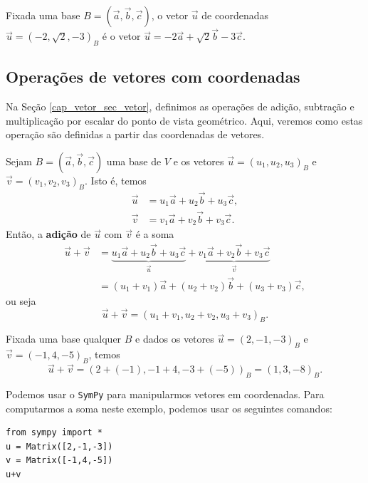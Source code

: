 \begin{ex}
  Fixada uma base $B = (\vec{a}, \vec{b}, \vec{c})$, o vetor $\vec{u}$ de coordenadas $\vec{u}=(-2,\sqrt{2},-3)_B$ é o vetor $\vec{u} = -2\vec{a} + \sqrt{2}\vec{b} - 3\vec{c}$.
\end{ex}

\subsection{Operações de vetores com coordenadas}


Na Seção \ref{cap_vetor_sec_vetor}, definimos as operações de adição, subtração e multiplicação por escalar do ponto de vista geométrico. Aqui, veremos como estas operação são definidas a partir das coordenadas de vetores.

Sejam $B = (\vec{a}, \vec{b}, \vec{c})$ uma base de $V$ e os vetores $\vec{u} = (u_1, u_2, u_3)_B$ e $\vec{v} = (v_1, v_2, v_3)_B$. Isto é, temos
\begin{align}
  \vec{u} &= u_1\vec{a} + u_2\vec{b} + u_3\vec{c},\\
  \vec{v} &= v_1\vec{a} + v_2\vec{b} + v_3\vec{c}.
\end{align}
Então, a {\bf adição} de $\vec{u}$ com $\vec{v}$ é a soma
\begin{align}
  \vec{u}+\vec{v} &= \underbrace{u_1\vec{a} + u_2\vec{b} + u_3\vec{c}}_{\vec{u}} + \underbrace{v_1\vec{a} + v_2\vec{b} + v_3\vec{c}}_{\vec{v}}\\
  &= (u_1+v_1)\vec{a} + (u_2+v_2)\vec{b} + (u_3+v_3)\vec{c},
\end{align}
ou seja
\begin{equation}
  \vec{u}+\vec{v}=(u_1+v_1, u_2+v_2, u_3+v_3)_B.
\end{equation}

\begin{ex}
  Fixada uma base qualquer $B$ e dados os vetores $\vec{u} = (2, -1, -3)_B$ e $\vec{v} = (-1, 4, -5)_B$, temos
  \begin{equation}
    \vec{u}+\vec{v} = \left(2+(-1), -1+4, -3+(-5)\right)_B = (1,3,-8)_B.
  \end{equation}

  \ifispython
  Podemos usar o \verb+SymPy+ para manipularmos vetores em coordenadas. Para computarmos a soma neste exemplo, podemos usar os seguintes comandos:
\begin{verbatim}
from sympy import *
u = Matrix([2,-1,-3])
v = Matrix([-1,4,-5])
u+v
\end{verbatim}
  \fi
\end{ex}

